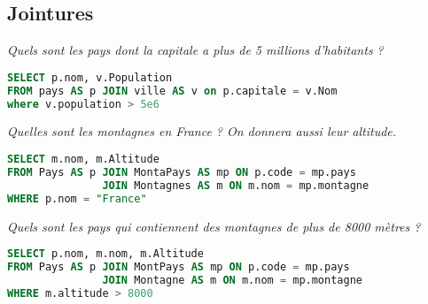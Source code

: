 \subsection{Jointures} 
\begin{Exercise}
\it Quels sont les pays dont la capitale a plus de 5 millions d'habitants ?
\end{Exercise}
\begin{Answer}
\begin{lstlisting}[language=SQL]
SELECT p.nom, v.Population
FROM pays AS p JOIN ville AS v on p.capitale = v.Nom
where v.population > 5e6
\end{lstlisting}
\end{Answer}
\begin{Exercise}
\it Quelles sont les montagnes en France ? On donnera aussi leur altitude.
\end{Exercise}
\begin{Answer}
\begin{lstlisting}[language=SQL]
SELECT m.nom, m.Altitude
FROM Pays AS p JOIN MontaPays AS mp ON p.code = mp.pays
               JOIN Montagnes AS m ON m.nom = mp.montagne
WHERE p.nom = "France"
\end{lstlisting}
\end{Answer}
\begin{Exercise}
\it Quels sont les pays qui contiennent des montagnes de plus de 8000 mètres ?
\end{Exercise}
\begin{Answer}
\begin{lstlisting}[language=SQL]
SELECT p.nom, m.nom, m.Altitude
FROM Pays AS p JOIN MontPays AS mp ON p.code = mp.pays
               JOIN Montagne AS m ON m.nom = mp.montagne
WHERE m.altitude > 8000
\end{lstlisting}
\end{Answer}
